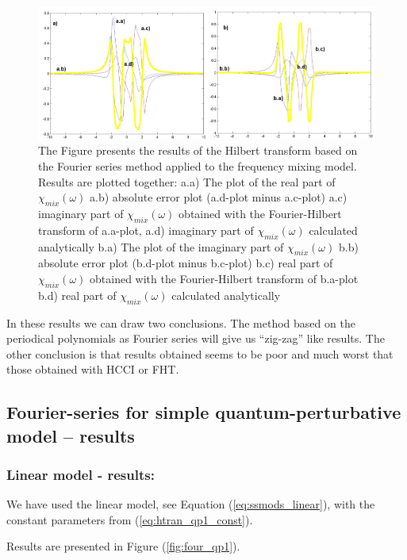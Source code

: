 \documentclass[12pt,twoside,a4paper]{article}
\numberwithin{equation}{subsection}
\numberwithin{figure}{subsection}
\begin{document}
\begin{figure} 
  \includegraphics[width=150mm]{img/four_fmix.png}
  \caption{ The Figure presents the results of the Hilbert transform based on the Fourier series method applied to the frequency mixing model. Results are plotted together:
     a.a) The plot of the real part of ${\chi_{mix}}(\omega )$
     a.b) absolute error plot (a.d-plot minus a.c-plot)
     a.c) imaginary part of ${\chi_{mix}}(\omega )$ obtained with the Fourier-Hilbert transform of a.a-plot, 
     a.d) imaginary part of ${\chi_{mix}}(\omega )$ calculated analytically 
     b.a) The plot of the imaginary part of ${\chi_{mix}}(\omega )$ 
     b.b) absolute error plot (b.d-plot minus b.c-plot)
     b.c) real part of ${\chi_{mix}}(\omega )$ obtained with the Fourier-Hilbert transform of b.a-plot  
     b.d) real part of $\chi_{mix} (\omega )$ calculated analytically 
     \label{fig:four_fmix}
     }
\end{figure}

In these results we can draw two conclusions. The method based on the periodical polynomials as Fourier series will give us ``zig-zag'' like results. The other conclusion is that results obtained seems to be poor and much worst that those obtained with HCCI or FHT. 

\subsection{Fourier-series for simple quantum-perturbative model -- results} \label{chap:fourier_quantum}

\subsubsection*{Linear model - results:}

We have used the linear model, see Equation (\ref{eq:ssmods_linear}), with the constant parameters from (\ref{eq:htran_qp1_const}).

Results are presented in Figure (\ref{fig:four_qp1}). 
\end{document}
